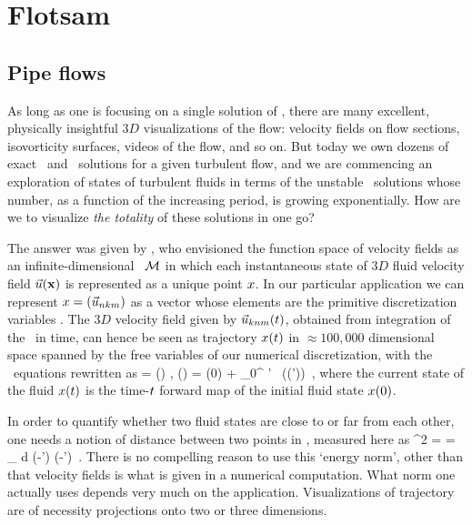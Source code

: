 
\section{Flotsam}
\label{s:flotsam}

\subsection{Pipe flows}
\label{s:review}

As long as one is focusing on a single solution of \NSe, there are many
excellent, physically insightful $3D$ visualizations of the flow:
velocity fields on flow sections, isovorticity surfaces, videos of the
flow, and so on. But today we own dozens of exact \eqv\ and \reqv\
solutions for a given turbulent flow, and we are commencing an exploration of
states of turbulent fluids in terms of the unstable \po\ solutions whose
number, as a function of the increasing period, is growing exponentially.
How are we to visualize \emph{the totality} of these solutions in one go?

The answer was given by \cite{hopf48}, who envisioned the function space
of {\NS} velocity fields as an infinite-dimensional \statesp\ ${\cal M}$ in
which each instantaneous state of $3D$ fluid velocity field $\vec{u}({\bf x})$ is
represented as a unique point $x$. In our particular application we
can represent $x = (\vec{u}_{nkm})$ as a vector whose elements are the
primitive discretization variables \refeq{pipeDiscr}. The $3D$ velocity
field given by $\vec{u}_{knm}(t)$, obtained from integration of the
\NSe\ in time, can hence be seen as trajectory $x(t)$ in
$\approx 100,000$ dimensional space spanned by the free variables of our
numerical discretization, with the \NS\ equations \refeq{NavStokesDev}
rewritten as
\beq
   \dot{\ssp} = \vel(\ssp) ,
   \qquad
   \ssp(\zeit) = \ssp(0)
            + \int_0^\zeit \! \zeit' \, \vel(\ssp(\zeit'))
\,,
where the current state of the fluid $ x(t)$ is the time-$t$
forward map of the initial fluid state  $x(0)$.

In order to quantify whether two fluid states are close to or far from
each other, one needs a notion of distance between two points in
\statesp, measured here as
\beq
  ^2  =  =
\int_\bCell \! d \bx \;
(-\vec{u}') \cdot (-')
\,.
There is no compelling reason to use this {`energy norm'}, other than
that velocity fields is what is given in a numerical computation. What
norm one actually uses depends very much on the application.
Visualizations of trajectory  are of necessity
projections onto two or three dimensions.

